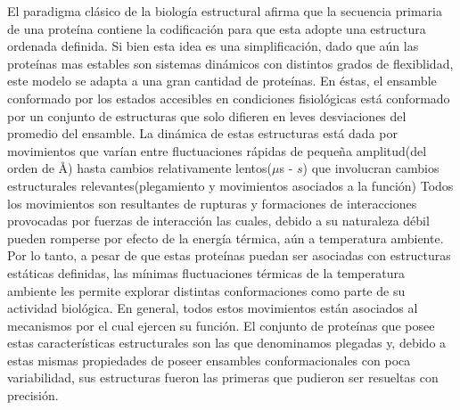 El paradigma clásico de la biología estructural afirma que la secuencia primaria de una proteína contiene la codificación para que esta adopte una estructura ordenada definida.
Si bien esta idea es una simplificación, dado que aún las proteínas mas estables son sistemas dinámicos con distintos grados de flexiblidad, este modelo se adapta a una gran cantidad de proteínas.
En éstas, el ensamble conformado por los estados accesibles en condiciones fisiológicas está conformado por un conjunto de estructuras que solo difieren en leves desviaciones del promedio del ensamble.
La dinámica de estas estructuras está dada por movimientos que varían entre fluctuaciones rápidas de pequeña amplitud(del orden de \AA) hasta cambios relativamente lentos($\mu$s - $s$) que involucran cambios estructurales relevantes(plegamiento y movimientos asociados a la función)
Todos los movimientos son resultantes de rupturas y formaciones de interacciones provocadas por fuerzas de interacción las cuales, debido a su naturaleza débil pueden romperse por efecto de la energía térmica, aún a temperatura ambiente.
Por lo tanto, a pesar de que estas proteínas puedan ser asociadas con estructuras estáticas definidas, las mínimas fluctuaciones térmicas de la temperatura ambiente les permite explorar distintas conformaciones como parte de su actividad biológica.
En general, todos estos movimientos están asociados al mecanismos por el cual ejercen su función.
El conjunto de proteínas que posee estas características estructurales son las que denominamos plegadas y, debido a estas mismas propiedades de poseer ensambles conformacionales con poca variabilidad, sus estructuras fueron las primeras que pudieron ser resueltas con precisión. 


